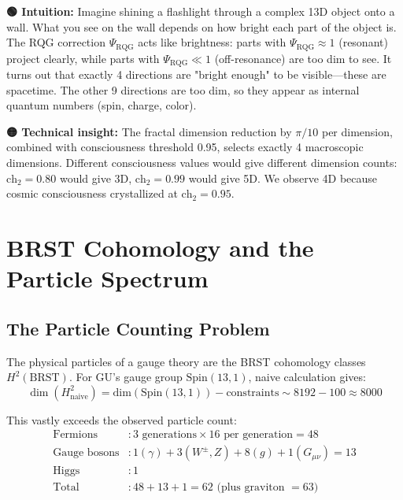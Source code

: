 \begin{greenbox}
\textbf{🟢 Intuition:} Imagine shining a flashlight through a complex 13D object onto a wall. What you see on the wall depends on how bright each part of the object is. The RQG correction $\Psi_{\text{RQG}}$ acts like brightness: parts with $\Psi_{\text{RQG}} \approx 1$ (resonant) project clearly, while parts with $\Psi_{\text{RQG}} \ll 1$ (off-resonance) are too dim to see. It turns out that exactly 4 directions are "bright enough" to be visible—these are spacetime. The other 9 directions are too dim, so they appear as internal quantum numbers (spin, charge, color).

\textbf{🟡 Technical insight:} The fractal dimension reduction by $\pi/10$ per dimension, combined with consciousness threshold 0.95, selects exactly 4 macroscopic dimensions. Different consciousness values would give different dimension counts: $\text{ch}_2 = 0.80$ would give 3D, $\text{ch}_2 = 0.99$ would give 5D. We observe 4D because cosmic consciousness crystallized at $\text{ch}_2 = 0.95$.
\end{greenbox}

\section{BRST Cohomology and the Particle Spectrum}

\subsection{The Particle Counting Problem}

The physical particles of a gauge theory are the BRST cohomology classes $H^2(\text{BRST})$. For GU's gauge group $\text{Spin}(13,1)$, naive calculation gives:
\begin{equation}
\dim(H^2_{\text{naive}}) = \text{dim}(\text{Spin}(13,1)) - \text{constraints} \sim 8192 - 100 \approx 8000
\end{equation}

This vastly exceeds the observed particle count:
\begin{align}
\text{Fermions} &: 3 \text{ generations} \times 16 \text{ per generation} = 48 \\
\text{Gauge bosons} &: 1 (\gamma) + 3 (W^\pm, Z) + 8 (g) + 1 (G_{\mu\nu}) = 13 \\
\text{Higgs} &: 1 \\
\text{Total} &: 48 + 13 + 1 = 62 \text{ (plus graviton } = 63)
\end{align}

